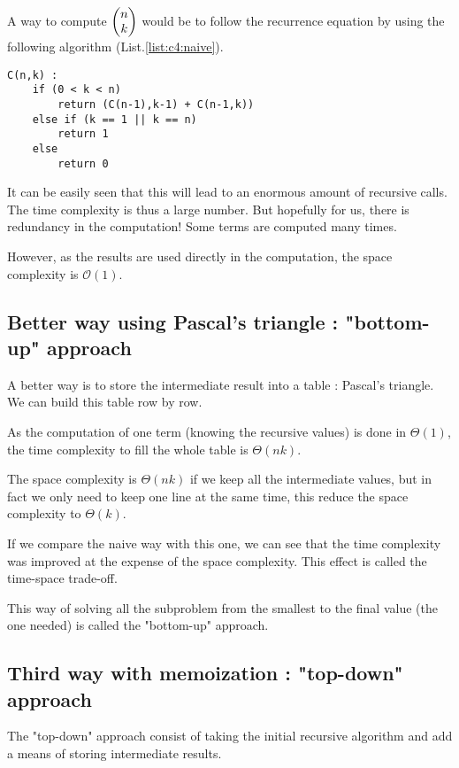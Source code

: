 A way to compute $\left( \begin{matrix} n\\ k\end{matrix} \right)$ would be to follow the recurrence equation by using the following algorithm (List.\ref{list:c4:naive}).

\begin{lstlisting}[label={list:c4:naive},caption=Pseudo-code of the naive algorithm for the combinatorial]
C(n,k) :
    if (0 < k < n)
        return (C(n-1),k-1) + C(n-1,k))
    else if (k == 1 || k == n)
        return 1
    else
        return 0
\end{lstlisting}

It can be easily seen that this will lead to an enormous amount of recursive calls. The time complexity is thus a large number. But hopefully for us, there is redundancy in the computation! Some terms are computed many times. 

However, as the results are used directly in the computation, the space complexity is $\mathcal{O}(1)$.



        \subsection{Better way using Pascal's triangle : "bottom-up" approach}




A better way is to store the intermediate result into a table : Pascal's triangle. We can build this table row by row.

As the computation of one term (knowing the recursive values) is done in $\Theta (1)$, the time complexity to fill the whole table is $\Theta (nk)$.

The space complexity is $\Theta (nk)$ if we keep all the intermediate values, but in fact we only need to keep one line at the same time, this reduce the space complexity to $\Theta (k)$.

If we compare the naive way with this one, we can see that the time complexity was improved at the expense of the space complexity. This effect is called the time-space trade-off.

This way of solving all the subproblem from the smallest to the final value (the one needed) is called the "bottom-up" approach.

\subsection{Third way with memoization : "top-down" approach} 

The "top-down" approach consist of taking the initial recursive algorithm and add a means of storing intermediate results.

